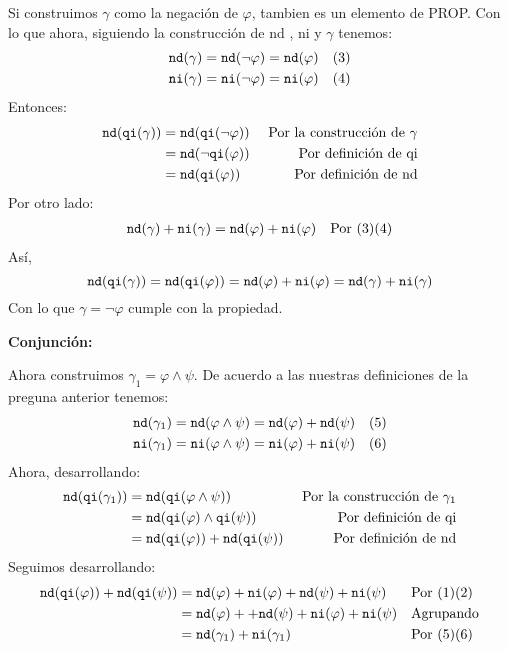 \documentclass[8pt, letterpaper]{article}
\begin{document}
\begin{enumerate}
  Si construimos $\gamma$ como la negación de $\varphi$, tambien es un elemento
  de PROP. Con lo que ahora, siguiendo la construcción de nd , ni y
  $\gamma$ tenemos:
   \begin{align*}
   {\tt nd}(\gamma) &= {\tt nd}(\neg\varphi) = {\tt nd}(\varphi) & (3) \\
   {\tt ni}(\gamma) &= {\tt ni}(\neg\varphi) = {\tt ni}(\varphi) & (4)
   \end{align*}
   Entonces:
   \begin{align*}
     {\tt nd}({\tt qi}(\gamma)) &= {\tt nd}({\tt qi}(\neg\varphi)) & \text{
       Por la construcción de } \gamma \\
     &= {\tt nd}(\neg{\tt qi}(\varphi)) & \text{ Por definición de qi} \\
     &= {\tt nd}({\tt qi}(\varphi)) & \text{ Por definición de nd} \\
     \end{align*}
   Por otro lado:
   \begin{align*}
     {\tt nd}(\gamma) + {\tt ni}(\gamma) &= {\tt nd}(\varphi) +
     {\tt ni}(\varphi) & \text{Por } (3)(4)
   \end{align*}
   Así,
   $$ {\tt nd}({\tt qi}(\gamma)) = {\tt nd}({\tt qi}(\varphi)) =
   {\tt nd}(\varphi) + {\tt ni}(\varphi) = {\tt nd}(\gamma) +
   {\tt ni}(\gamma)$$
   Con lo que $\gamma = \neg\varphi$ cumple con la propiedad.

   \hfill\break
   {\bf Conjunción:}

   Ahora construimos $\gamma_1 = \varphi \land \psi$. De acuerdo a las nuestras
   definiciones de la preguna anterior tenemos:
   \begin{align*}
     {\tt nd}(\gamma_1) &= {\tt nd}(\varphi\land\psi) = {\tt nd}(\varphi) +
     {\tt nd}(\psi)& (5) \\
     {\tt ni}(\gamma_1) &= {\tt ni}(\varphi\land\psi) = {\tt ni}(\varphi) +
     {\tt ni}(\psi)& (6)
   \end{align*}
   Ahora, desarrollando:
   \begin{align*}
     {\tt nd}({\tt qi}(\gamma_1)) &= {\tt nd}({\tt qi}(\varphi\land\psi))
     & \text{
       Por la construcción de } \gamma_1 \\
     &= {\tt nd}({\tt qi}(\varphi)\land{\tt qi}(\psi)) & \text{
       Por definición de qi} \\
     &= {\tt nd}({\tt qi}(\varphi)) + {\tt nd}({\tt qi}(\psi)) &
       \text{ Por definición de nd} \\
   \end{align*}
   Seguimos desarrollando:
   \begin{align*}
     {\tt nd}({\tt qi}(\varphi)) + {\tt nd}({\tt qi}(\psi)) &=
     {\tt nd}(\varphi) + {\tt ni}(\varphi)+{\tt nd}(\psi) + {\tt ni}(\psi)
     & &\text{Por } (1)(2)\\
     &= {\tt nd}(\varphi) ++{\tt nd}(\psi) + {\tt ni}(\varphi) + 
     {\tt ni}(\psi) & &\text{Agrupando}\\
     &=  {\tt nd}(\gamma_1) + {\tt ni}(\gamma_1)& &\text{Por } (5)(6)
     \end{align*}


\end{enumerate}
\end{document}
